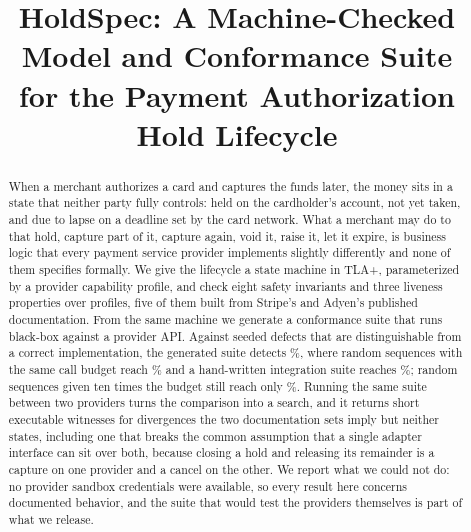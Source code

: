 \documentclass[conference]{IEEEtran}
\begin{document}
\title{HoldSpec: A Machine-Checked Model and Conformance Suite\\
for the Payment Authorization Hold Lifecycle}

\author{
}

\maketitle

\begin{abstract}
When a merchant authorizes a card and captures the funds later, the money sits
in a state that neither party fully controls: held on the cardholder's account,
not yet taken, and due to lapse on a deadline set by the card network. What a
merchant may do to that hold, capture part of it, capture again, void it,
raise it, let it expire, is business logic that every payment service provider
implements slightly differently and none of them specifies formally. We give the
lifecycle a state machine in TLA+, parameterized by a provider capability
profile, and check eight safety invariants and three liveness properties over
\numprofiles{} profiles, five of them built from Stripe's and Adyen's published
documentation.
From the same machine we generate a conformance suite that runs black-box
against a provider API. Against \killablemutants{} seeded defects that are
distinguishable from a correct implementation, the generated suite detects
\modelrate{}\%, where random sequences with the same call budget reach
\randomrate{}\% and a hand-written integration suite reaches \handrate{}\%;
random sequences given ten times the budget still reach only
\randomtenxrate{}\%. Running the same suite between two providers turns the
comparison into a search, and it returns short executable witnesses for
divergences the two documentation sets imply but neither states, including
one that breaks the common assumption that a single adapter interface can sit
over both, because closing a hold and releasing its remainder is a capture on
one provider and a cancel on the other. We report what we could not do: no
provider sandbox credentials were available, so every result here concerns
documented behavior, and the suite that would test the providers themselves is
part of what we release.
\end{abstract}
\end{document}
